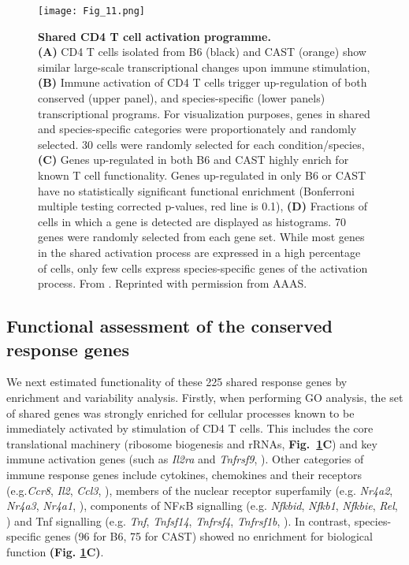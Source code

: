 \begin{figure}[!ht]
\centering
\texttt{[image: Fig\_11.png]}
\caption[Shared CD4\plus{} T cell activation programme]{\textbf{Shared CD4\plus{} T cell activation programme.}\\
\textbf{(A)} CD4\plus{} T cells isolated from B6 (black) and CAST (orange) show similar large-scale transcriptional changes upon immune stimulation, \textbf{(B)} Immune activation of CD4\plus{} T cells trigger up-regulation of both conserved (upper panel), and species-specific (lower panels) transcriptional programs. For visualization purposes, genes in shared and species-specific categories were proportionately and randomly selected. 30 cells were randomly selected for each condition/species, \textbf{(C)} Genes up-regulated in both B6 and CAST highly enrich for known T cell functionality. Genes up-regulated in only B6 or CAST have no statistically significant functional enrichment (Bonferroni multiple testing corrected p-values, red line is 0.1), \textbf{(D)} Fractions of cells in which a gene is detected are displayed as histograms. 70 genes were randomly selected from each gene set. While most genes in the shared activation process are expressed in a high percentage of cells, only few cells express species-specific genes of the activation process. From \citep{Martinez-jimenez2017}. Reprinted with permission from AAAS.}
\label{fig1:shared_activation}
\end{figure}

\newpage

\subsection{Functional assessment of the conserved response genes}

We next estimated functionality of these 225 shared response genes by enrichment and variability analysis. Firstly, when performing GO analysis, the set of shared genes was strongly enriched for cellular processes known to be immediately activated by stimulation of CD4\plus{} T cells. This includes the core translational machinery (ribosome biogenesis and rRNAs, \textbf{Fig.~\ref{fig1:shared_activation}C}) and key immune activation genes (such as \textit{Il2ra} and \textit{Tnfrsf9}, \citep{Asmal2003}). Other categories of immune response genes include cytokines, chemokines and their receptors (e.g.\textit{Ccr8}, \textit{Il2}, \textit{Ccl3}, \citep{Turner2014}), members of the nuclear receptor superfamily (e.g. \textit{Nr4a2}, \textit{Nr4a3}, \textit{Nr4a1}, \citep{Glass2010}), components of NF$\kappa$B signalling (e.g. \textit{Nfkbid}, \textit{Nfkb1}, \textit{Nfkbie}, \textit{Rel}, \citep{Gerondakis2010}) and Tnf signalling (e.g. \textit{Tnf}, \textit{Tnfsf14}, \textit{Tnfrsf4}, \textit{Tnfrsf1b}, \citep{Croft2009}). In contrast, species-specific genes (96 for B6, 75 for CAST) showed no enrichment for biological function \textbf{(Fig. \ref{fig1:shared_activation}C)}. \\

